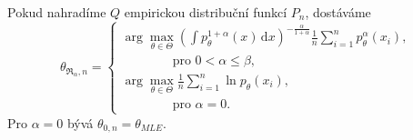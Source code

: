 \documentclass[11pt,a4paper]{beamer}
\newcommand{\intpa}{\int p_\theta^{1+\alpha}(x) \, \mathrm{d}x }
\newcommand{\fn}{\frac{1}{n} \sum_{i=1}^n p_{\theta}^{\alpha}\left( x_i \right)}
\newcommand{\fln}{\frac{1}{n} \sum_{i=1}^n \ln p_{\theta}\left( x_i \right)}
\newcommand{\amtiT}{\arg \max_{\theta \in \Theta}}
\begin{document}

\begin{frame}
Pokud nahradíme $Q$ empirickou distribuční funkcí $P_n$, dostáváme 
\begin{equation*}
	\theta_{\mathfrak{R}_\alpha,n} = 
	\begin{cases}
		\displaystyle{ \amtiT \left( \intpa \right)^{-\frac{\alpha}{1+\alpha}} \fn }, \\
		\qquad \qquad \text{pro } 0 < \alpha \leq \beta, \\
		\displaystyle{ \amtiT  \fln },\\
		\qquad \qquad \text{pro } \alpha = 0.
	\end{cases}	
\end{equation*}
	Pro $\alpha = 0 $ bývá $\theta_{0,n} = \theta_{MLE}.$
\end{frame}
\end{document}
